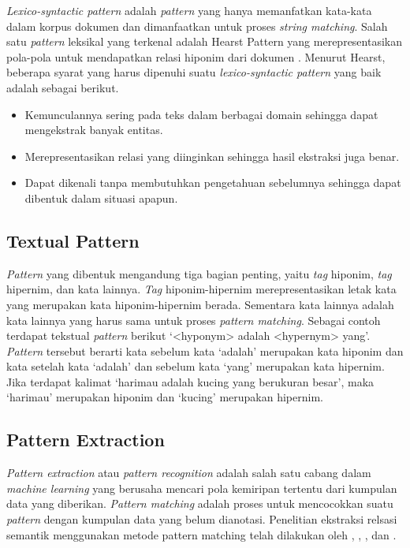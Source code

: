 \textit{Lexico-syntactic pattern} adalah \textit{pattern} yang hanya memanfatkan kata-kata dalam korpus dokumen dan dimanfaatkan untuk proses \textit{string matching}. Salah satu \textit{pattern} leksikal yang terkenal adalah Hearst Pattern yang merepresentasikan pola-pola untuk mendapatkan relasi hiponim dari dokumen \citep{hearst1992automatic}. Menurut Hearst, beberapa syarat yang harus dipenuhi suatu \textit{lexico-syntactic pattern} yang baik adalah sebagai berikut.
\begin{itemize}
  \item Kemunculannya sering pada teks dalam berbagai domain sehingga dapat mengekstrak banyak entitas.
  \item Merepresentasikan relasi yang diinginkan sehingga hasil ekstraksi juga benar.
  \item Dapat dikenali tanpa membutuhkan pengetahuan sebelumnya sehingga dapat dibentuk dalam situasi apapun.
\end{itemize}

\subsection{Textual Pattern}
\textit{Pattern} yang dibentuk mengandung tiga bagian penting, yaitu \textit{tag} hiponim, \textit{tag} hipernim, dan kata lainnya. \textit{Tag} hiponim-hipernim merepresentasikan letak kata yang merupakan kata hiponim-hipernim berada. Sementara kata lainnya adalah kata lainnya yang harus sama untuk proses \textit{pattern matching}. Sebagai contoh terdapat tekstual \textit{pattern} berikut `<hyponym> adalah <hypernym> yang'. \textit{Pattern} tersebut berarti kata sebelum kata `adalah' merupakan kata hiponim dan kata setelah kata `adalah' dan sebelum kata `yang' merupakan kata hipernim. Jika terdapat kalimat `harimau adalah kucing yang berukuran besar', maka `harimau' merupakan hiponim dan `kucing' merupakan hipernim. 

\subsection{Pattern Extraction}
\textit{Pattern extraction} atau \textit{pattern recognition} adalah salah satu cabang dalam \textit{machine learning} yang berusaha mencari pola kemiripan tertentu dari kumpulan data yang diberikan. \textit{Pattern matching} adalah proses untuk mencocokkan suatu \textit{pattern} dengan kumpulan data yang belum dianotasi. Penelitian ekstraksi relsasi semantik menggunakan metode pattern matching telah dilakukan oleh \cite{hearst1992automatic}, \cite{ruiz2005automatic}, \cite{arnold2014extracting}, dan \cite{sumida2008hacking}.

